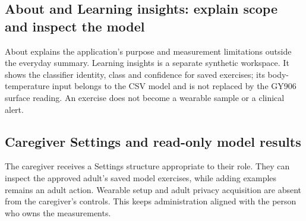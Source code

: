 \clearpage
\subsection{About and Learning insights: explain scope and inspect the model}
About explains the application's purpose and measurement limitations outside the everyday summary. Learning insights is a separate synthetic workspace. It shows the classifier identity, class and confidence for saved exercises; its body-temperature input belongs to the CSV model and is not replaced by the GY906 surface reading. An exercise does not become a wearable sample or a clinical alert.


\clearpage
\subsection{Caregiver Settings and read-only model results}
The caregiver receives a Settings structure appropriate to their role. They can inspect the approved adult's saved model exercises, while adding examples remains an adult action. Wearable setup and adult privacy acquisition are absent from the caregiver's controls. This keeps administration aligned with the person who owns the measurements.


